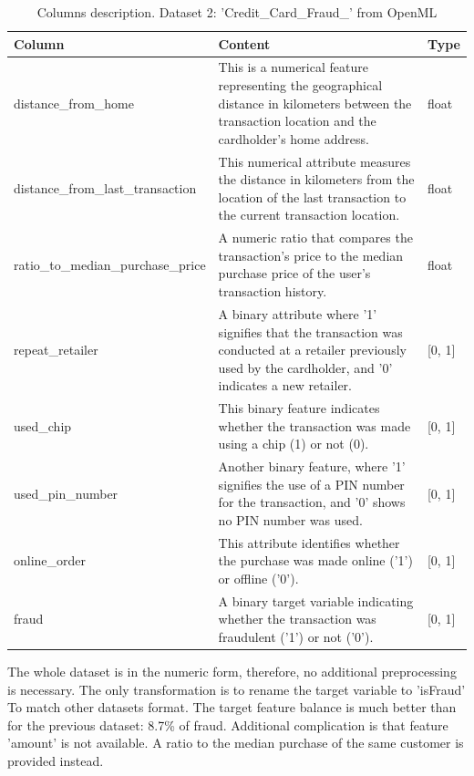 \documentclass[12pt,a4paper, hidelinks]{article}
\begin{document}
\begin{table}[ht!]
    \centering
    \begin{tabular}{|p{5.5cm}|p{7cm}|p{2cm}|}
    \hline
    \textbf{Column} & \textbf{Content} & \textbf{Type} \\
    \hline
    distance\_from\_home & This is a numerical feature representing the geographical distance in kilometers between the transaction location and the cardholder's home address. & float \\
    \hline
    distance\_from\_last\_transaction & This numerical attribute measures the distance in kilometers from the location of the last transaction to the current transaction location. & float \\
    \hline
    ratio\_to\_median\_purchase\_price & A numeric ratio that compares the transaction's price to the median purchase price of the user's transaction history. & float \\
    \hline
    repeat\_retailer & A binary attribute where '1' signifies that the transaction was conducted at a retailer previously used by the cardholder, and '0' indicates a new retailer. & [0, 1] \\
    \hline
    used\_chip & This binary feature indicates whether the transaction was made using a chip (1) or not (0). & [0, 1] \\
    \hline
    used\_pin\_number &  Another binary feature, where '1' signifies the use of a PIN number for the transaction, and '0' shows no PIN number was used. & [0, 1] \\
    \hline
    online\_order & This attribute identifies whether the purchase was made online ('1') or offline ('0'). & [0, 1] \\
    \hline
    fraud & A binary target variable indicating whether the transaction was fraudulent ('1') or not ('0'). & [0, 1] \\
    \hline
    \end{tabular}
    \caption{Columns description. Dataset 2: 'Credit\_Card\_Fraud\_' from OpenML}
\end{table}

The whole dataset is in the numeric form, therefore, no additional preprocessing is necessary. The only transformation is to rename the target variable to 'isFraud' To match other datasets format.
The target feature balance is much better than for the previous dataset: 8.7\% of fraud. Additional complication is that feature 'amount' is not available. A ratio to the median purchase of the same customer is provided instead.
\end{document}
